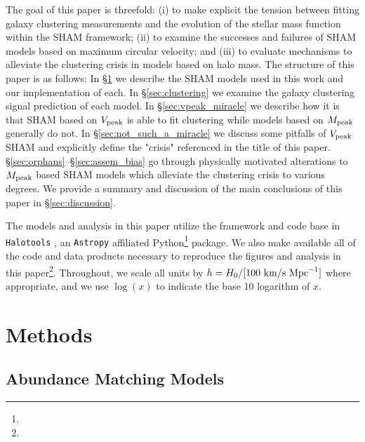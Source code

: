 \documentclass[useAMS,fleqn,usenatbib]{mnras}
\begin{document}
The goal of this paper is threefold: (i) to make explicit the tension between fitting galaxy clustering measurements and the evolution of the stellar mass function within the SHAM framework; (ii) to examine the successes and failures of SHAM models based on maximum circular velocity; and (iii) to evaluate mechanisms to alleviate the clustering crisis in models based on halo mass.  The structure of this paper is as follows: In \S \ref{sec:methods} we describe the SHAM models used in this work and our implementation of each.  In \S \ref{sec:clustering} we examine the galaxy clustering signal prediction of each model.  In \S \ref{sec:vpeak_miracle} we describe how it is that SHAM based on $V_{\rm peak}$ is able to fit clustering while models based on $M_{\rm peak}$ generally do not.  In \S \ref{sec:not_such_a_miracle} we discuss some pitfalls of $V_{\rm peak}$ SHAM and explicitly define the "crisis" referenced in the title of this paper.  \S \ref{sec:orphans}--\S \ref{sec:assem_bias} go through physically motivated alterations to $M_{\rm peak}$ based SHAM models which alleviate the clustering crisis to various degrees.  We provide a summary and discussion of the main conclusions of this paper in \S \ref{sec:discussion}.

The models and analysis in this paper utilize the framework and code base in {\tt Halotools} \citep{Hearin:2016tc}, an {\tt Astropy} \citep{TheAstropyCollaboration:2013cd} affiliated Python\footnote{} package.  We also make available all of the code and data products necessary to reproduce the figures and analysis in this paper\footnote{}.  Throughout, we scale all units by $h = H_0/[100~{\rm km/s}~{\rm Mpc}^{-1}]$ where appropriate, and we use $\log(x)$ to indicate the base 10 logarithm of $x$.


\section{Methods}
\label{sec:methods}

\subsection{Abundance Matching Models}
\end{document}
